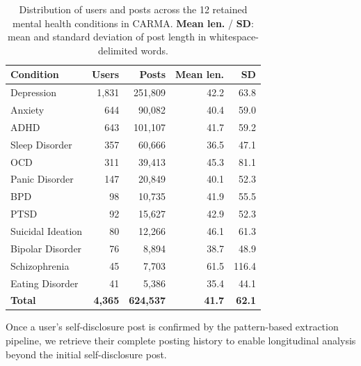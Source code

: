 \documentclass[11pt]{article}
\begin{document}
\begin{table}[h]
\centering
\small
\begin{tabular}{lrrrr}
\toprule
\textbf{Condition} & \textbf{Users} & \textbf{Posts} & \textbf{Mean len.} & \textbf{SD} \\
\midrule
Depression          & 1,831 & 251,809 & 42.2 & 63.8 \\
Anxiety             &   644 &  90,082 & 40.4 & 59.0 \\
ADHD                &   643 & 101,107 & 41.7 & 59.2 \\
Sleep Disorder      &   357 &  60,666 & 36.5 & 47.1 \\
OCD                 &   311 &  39,413 & 45.3 & 81.1 \\
Panic Disorder      &   147 &  20,849 & 40.1 & 52.3 \\
BPD                 &    98 &  10,735 & 41.9 & 55.5 \\
PTSD                &    92 &  15,627 & 42.9 & 52.3 \\
Suicidal Ideation   &    80 &  12,266 & 46.1 & 61.3 \\
Bipolar Disorder    &    76 &   8,894 & 38.7 & 48.9 \\
Schizophrenia       &    45 &   7,703 & 61.5 & 116.4 \\
Eating Disorder     &    41 &   5,386 & 35.4 & 44.1 \\
\midrule
\textbf{Total} & \textbf{4,365} & \textbf{624,537} & \textbf{41.7} & \textbf{62.1} \\
\bottomrule
\end{tabular}
\caption{Distribution of users and posts across the 12 retained mental
health conditions in CARMA.
\textbf{Mean len.} / \textbf{SD}: mean and standard deviation of post
length in whitespace-delimited words.}
\label{tab:corpus_summary}
\end{table}


Once a user's self-disclosure post is confirmed by the pattern-based extraction pipeline, we retrieve their complete posting history to enable longitudinal analysis beyond the initial self-disclosure post.
\end{document}
